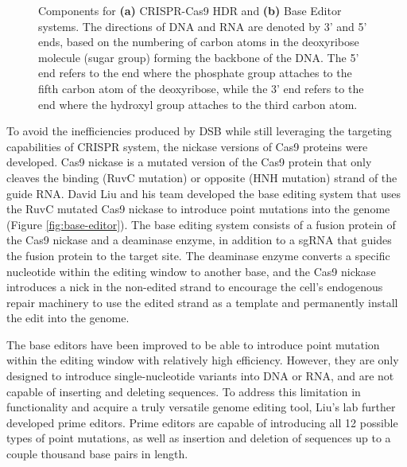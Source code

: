 \begin{figure}[ht]
    \centering
    \caption[Components of HDR and BE]{Components for \textbf{(a)} CRISPR-Cas9 HDR  and \textbf{(b)} Base Editor  systems. The directions of DNA and RNA are denoted by 3' and 5' ends, based on the numbering of carbon atoms in the deoxyribose molecule (sugar group) forming the backbone of the DNA. The 5' end refers to the end where the phosphate  group attaches to the fifth carbon atom of the deoxyribose, while the 3' end refers to the end where the hydroxyl group  attaches to the third carbon atom.}
    \label{fig:crispr-base-editor}
\end{figure}

To avoid the inefficiencies produced by DSB while still leveraging the targeting capabilities of CRISPR system, the nickase versions of Cas9 proteins were developed. Cas9 nickase is a mutated version of the Cas9 protein that only cleaves the binding (RuvC mutation) or opposite (HNH mutation) strand of the guide RNA\cite{dasCRISPRBasedTherapeutics2022}. David Liu and his team developed the base editing system that uses the RuvC mutated Cas9 nickase to introduce point mutations into the genome (Figure \ref{fig:base-editor})\cite{gaudelliProgrammableBaseEditing2017}. The base editing system consists of a fusion protein of the Cas9 nickase and a deaminase enzyme, in addition to a sgRNA that guides the fusion protein to the target site. The deaminase enzyme converts a specific nucleotide within the editing window to another base, and the Cas9 nickase introduces a nick in the non-edited strand to encourage the cell's endogenous repair machinery to use the edited strand as a template and permanently install the edit into the genome.

The base editors have been improved to be able to introduce point mutation within the editing window with relatively high efficiency\cite{portoBaseEditingAdvances2020}. However, they are only designed to introduce single-nucleotide variants into DNA or RNA, and are not capable of inserting and deleting sequences. To address this limitation in functionality and acquire a truly versatile genome editing tool, Liu's lab further developed prime editors\cite{liudavidr.SearchandreplaceGenomeEditing2019}. Prime editors are capable of introducing all 12 possible types of point mutations, as well as insertion and deletion of sequences up to a couple thousand base pairs in length\cite{linHighefficiencyPrimeEditing2021}. 

